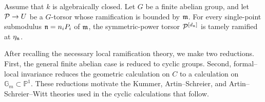 \begin{theorem}\label{theorem:torsors_after_blowup_is_tame}
Assume that $k$ is algebraically closed.
Let $G$ be a finite abelian group, and let $\mathcal{P} \to U$ be a $G$-torsor whose
ramification is bounded by $\mathfrak{m}$. For every single-point submodulus
$\mathfrak{n} = n_iP_i$ of $\mathfrak{m}$, the symmetric-power torsor
$\mathcal{P}^{[d_{\mathfrak{n}}]}$ is tamely ramified at $\eta_{\mathfrak{n}}$.
\end{theorem}

After recalling the necessary local ramification theory, we make two
reductions. First, the general finite abelian case is reduced to cyclic groups.
Second, formal--local invariance reduces the geometric calculation on $C$ to a
calculation on $\mathbb{G}_m \subset \mathbb{P}^1$. These reductions motivate the
Kummer, Artin--Schreier, and Artin--Schreier--Witt theories used in the cyclic
calculations that follow.










